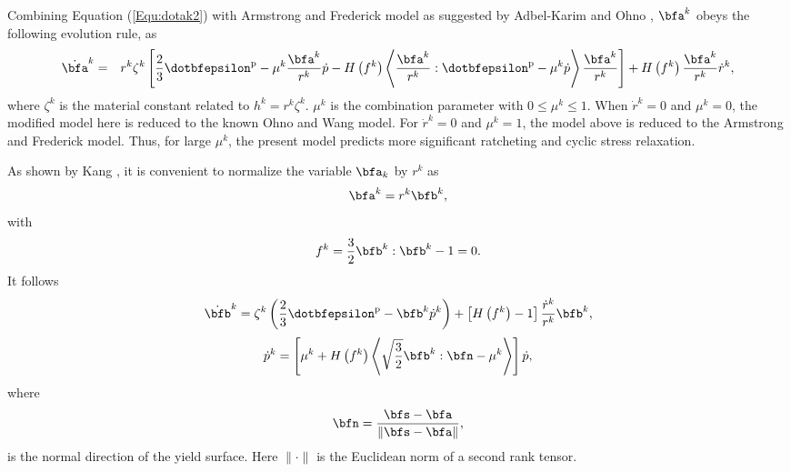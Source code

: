 Combining Equation (\ref{Equ:dotak2}) with Armstrong and Frederick model as suggested by Adbel-Karim and Ohno  \cite{AbdelKarim20051303},  ${\bfa^k}$ obeys the following evolution rule, as
\begin{eqnarray}
\label{Equ:dotak3}
{\dot\bfa^k} &=& {r^k}{\zeta ^k}\left[ \frac{2}{3}{{\dotbfepsilon}^{\rm{p}}} - {\mu ^k}\frac{\bfa^k}{r^k}\dot p - H\left( {f^k} \right) \left\langle {\frac{\bfa^k}{r^k}:{\dotbfepsilon}^{\rm{p}}} - {\mu ^k}\dot p \right\rangle \frac{\bfa^k}{r^k} \right]
+ H\left( {f^k} \right)\frac{\bfa^k}{r^k}{\dot r^k},
\end{eqnarray}
where ${\zeta ^k}$ is the material constant related to ${h^k} = {r^k}{\zeta ^k}$. ${\mu ^k}$ is the combination parameter with $0 \leqslant {\mu ^k} \leqslant 1$. When ${\dot r^k} = 0$ and ${\mu ^k} = 0$, the modified model here is reduced to the known Ohno and Wang model. For ${\dot r^k} = 0$ and ${\mu ^k} = 1$, the  model above is reduced to the Armstrong and Frederick model. Thus, for large ${\mu ^k}$, the present model predicts more significant ratcheting and cyclic stress relaxation.

As shown by Kang \cite{Kang2004299}, it is convenient to normalize the variable $\bfa_k$ by $r^k$ as
\begin{equation}
\label{Equ:ak1}
{\bfa^k} = {r^k}{\bfb^k},
\end{equation}
with
\begin{equation}
{f^k} = \frac{3}{2}{\bfb^k}:{\bfb^k} - 1 = 0.
\end{equation}
It follows
\begin{equation}
{\dot\bfb^k} = {\zeta ^k}\left( {\frac{2}{3}{\dotbfepsilon^{\rm{p}}} - {\bfb^k}{{\dot p}^k}} \right) + \left[ {H\left( {{f^k}} \right) - 1} \right]\frac{{{{\dot r}^k}}}{{{r^k}}}{\bfb^k},
\end{equation}
\begin{equation}
{\dot p^k} = \left[ {{\mu ^k} + H\left( {{f^k}} \right)\left\langle {\sqrt {\frac{3}{2}} {\bfb^k}:\bfn - {\mu ^k}} \right\rangle } \right]\dot p,
\end{equation}
where
\begin{equation}
\bfn = \frac{{\bfs - \bfa}}{{\left\| {\bfs - \bfa} \right\|}},
\end{equation}
is the normal direction of the yield surface. Here $\parallel\cdot\parallel$ is the Euclidean norm of a second rank tensor.


